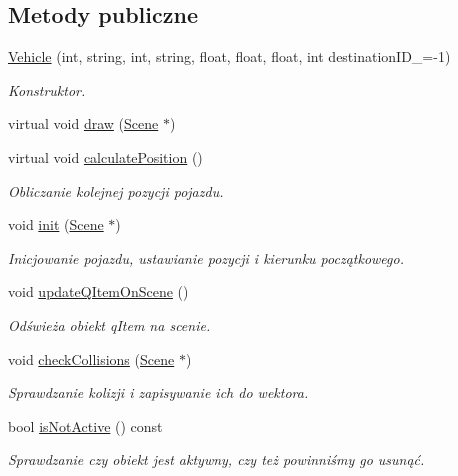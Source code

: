 \subsection*{Metody publiczne}
\begin{DoxyCompactItemize}
\item 
\hyperlink{class_vehicle_acf02f2a9fb11d57389e3cc9f799293f7}{Vehicle} (int, string, int, string, float, float, float, int destination\-I\-D\-\_\-=-\/1)
\begin{DoxyCompactList}\small\item\em Konstruktor. \end{DoxyCompactList}\item 
virtual void \hyperlink{class_vehicle_a91c55b0a0ffc22c4f759452332b9ecd0}{draw} (\hyperlink{class_scene}{Scene} $\ast$)
\item 
virtual void \hyperlink{class_vehicle_ad5a55c6646313b8105b6dbb95b8eb89c}{calculate\-Position} ()
\begin{DoxyCompactList}\small\item\em Obliczanie kolejnej pozycji pojazdu. \end{DoxyCompactList}\item 
void \hyperlink{class_vehicle_a3e1a25a1506590ff2eaafdf6a7c85b65}{init} (\hyperlink{class_scene}{Scene} $\ast$)
\begin{DoxyCompactList}\small\item\em Inicjowanie pojazdu, ustawianie pozycji i kierunku początkowego. \end{DoxyCompactList}\item 
void \hyperlink{class_vehicle_a9ebd11c19fb0db693d4e3d6f5b45b5c2}{update\-Q\-Item\-On\-Scene} ()
\begin{DoxyCompactList}\small\item\em Odświeża obiekt q\-Item na scenie. \end{DoxyCompactList}\item 
void \hyperlink{class_vehicle_aa73d614ac4d0e4cf44aa0168cb89fb50}{check\-Collisions} (\hyperlink{class_scene}{Scene} $\ast$)
\begin{DoxyCompactList}\small\item\em Sprawdzanie kolizji i zapisywanie ich do wektora. \end{DoxyCompactList}\item 
bool \hyperlink{class_vehicle_aa0bcf3409ace641a42c87609a83e0ad8}{is\-Not\-Active} () const 
\begin{DoxyCompactList}\small\item\em Sprawdzanie czy obiekt jest aktywny, czy też powinniśmy go usunąć. \end{DoxyCompactList}\item 

\end{DoxyCompactItemize}
